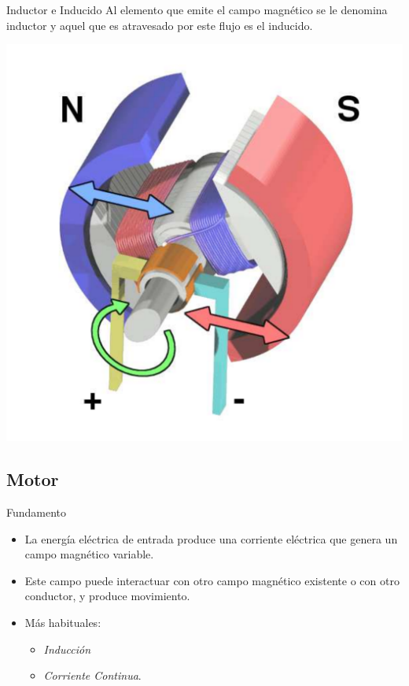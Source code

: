 \documentclass[xcolor={usenames,svgnames,dvipsnames}]{beamer}
\begin{document}
\begin{frame}[label={sec:org9931e6d}]{Inductor e Inducido}
Al elemento que emite el campo magnético se le denomina \alert{inductor} y aquel que es atravesado por este flujo es el \alert{inducido}.
\begin{center}
\includegraphics[height=0.5\textheight]{../figs/Electric_motor_cycle_3.pdf}
\end{center}
\end{frame}

\subsection{Motor}
\label{sec:orgcf07c78}
\begin{frame}[label={sec:org5bf2508}]{Fundamento}
\begin{itemize}
\item La energía eléctrica de \alert{entrada} produce una \alert{corriente eléctrica} que genera un \alert{campo magnético variable}.
\item Este campo puede \alert{interactuar} con otro \alert{campo magnético existente} o con \alert{otro conductor}, y produce movimiento.
\item Más habituales:
\begin{itemize}
\item \emph{Inducción}
\item \emph{Corriente Continua}.
\end{itemize}
\end{itemize}
\end{frame}
\end{document}
